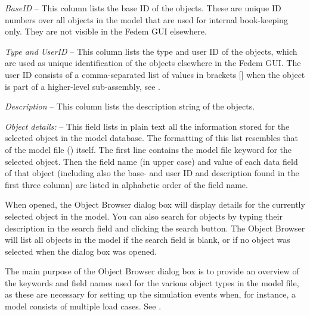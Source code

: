\begin{bulletlist}
\item{\sl BaseID} --
  This column lists the base ID of the objects.
  These are unique ID numbers over all objects in the model that are used for
  internal book-keeping only. They are not visible in the Fedem GUI elsewhere.
\item{\sl Type and UserID} --
  This column lists the type and user ID of the objects, which are used as
  unique identification of the objects elsewhere in the Fedem GUI.
  The user ID consists of a comma-separated list of values in brackets []
  when the object is part of a higher-level sub-assembly, see
  .
\item{\sl Description} --
  This column lists the description string of the objects.
\item{\sl Object details:} --
  This field lists in plain text all the information stored for the selected
  object in the model database. The formatting of this list resembles that of
  the model file () itself.
  The first line contains the model file keyword for the selected object.
  Then the field name (in upper case) and value of each data field of that
  object (including also the base- and user ID and description found in the
  first three column) are listed in alphabetic order of the field name.
\end{bulletlist}


When opened, the Object Browser dialog box
will display details for the currently selected object in the model. You can
also search for objects by typing their description in the search field and
clicking the search button. The Object Browser will list all objects in the
model if the search field is blank, or if no object was selected when the
dialog box was opened.


The main purpose of the Object Browser dialog box is to provide an
overview of the keywords and field names used for the various object types
in the model file, as these are necessary for setting up the simulation events
when, for instance, a model consists of multiple load cases.
See .


